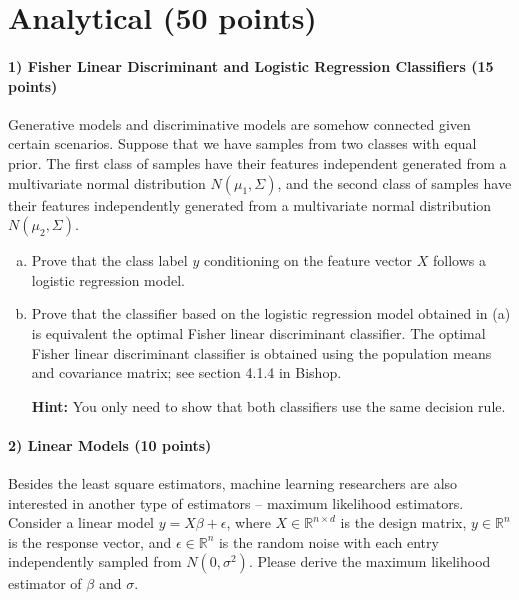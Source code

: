 \documentclass[11pt]{article}
\begin{document}
\section{Analytical (50 points)}

\paragraph{1) Fisher Linear Discriminant and Logistic Regression Classifiers (15 points)}
Generative models and discriminative models are somehow connected given certain scenarios. Suppose that we have samples from two classes with equal prior. The first class of samples have their features independent generated from a multivariate normal distribution $N(\mu_1,\Sigma)$, and the second class of samples have their features independently generated from a multivariate normal distribution $N(\mu_2,\Sigma)$.
\begin{enumerate}[(a)]
\item Prove that the class label $y$ conditioning on the feature vector $X$ follows a logistic regression model.
\item Prove that the classifier based on the logistic regression model obtained in (a) is equivalent the optimal Fisher linear discriminant classifier.  The optimal Fisher linear discriminant classifier is obtained using the population means and covariance matrix; see section 4.1.4 in Bishop.

{\bf Hint:} You only need to show that both classifiers use the same decision rule.
\end{enumerate}


\paragraph{2) Linear Models (10 points)}

Besides the least square estimators, machine learning researchers are also interested in another type of estimators -- maximum likelihood estimators. Consider a linear model $y=X\beta+\epsilon$, where $X\in\mathbb{R}^{n \times d}$ is the design matrix, $y\in\mathbb{R}^{n}$ is the response vector, and $\epsilon\in\mathbb{R}^n$ is the random noise with each entry independently sampled from $N(0,\sigma^2)$. 
Please derive the maximum likelihood estimator of $\beta$ and $\sigma$.
\end{document}

